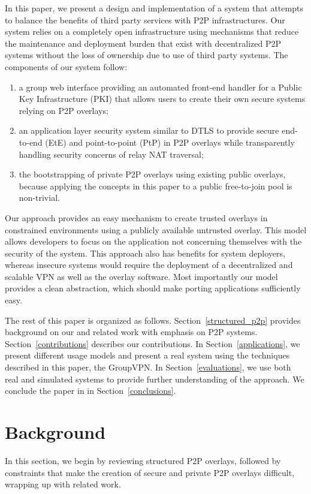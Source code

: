 \documentclass[conference]{IEEEtran}
\begin{document}
In this paper, we present a design and implementation of a system that attempts
to balance the benefits of third party services with P2P infrastructures.
Our system relies on a completely open infrastructure using mechanisms that
reduce the maintenance and deployment burden that exist with decentralized
P2P systems without the loss of ownership due to use of third party systems.
The components of our system follow:
\begin{enumerate}
\setlength{\itemsep}{0pt}
\setlength{\parskip}{0pt}
\item a group web interface providing an automated front-end handler for a 
Public Key Infrastructure (PKI) that allows users to create their own secure
systems relying on P2P overlays;
\item an application layer security system similar to DTLS to provide secure
end-to-end (EtE) and point-to-point (PtP) in P2P overlays while transparently
handling security concerns of relay NAT traversal;
\item the bootstrapping of private P2P overlays using existing public overlays,
because applying the concepts in this paper to a public free-to-join pool
is non-trivial.
\end{enumerate}

Our approach provides an easy mechanism to create trusted overlays in
constrained environments using a publicly available untrusted overlay.  This
model allows developers to focus on the application not concerning themselves
with the security of the system.  This approach also has benefits for system
deployers, whereas insecure systems would require the deployment of a
decentralized and scalable VPN as well as the overlay software.  Most
importantly our model provides a clean abstraction, which should make porting
applications sufficiently easy.

The rest of this paper is organized as follows.  Section~\ref{structured_p2p}
provides background on our and related work with emphasis on P2P systems.
Section~\ref{contributions} describes our contributions.  In
Section~\ref{applications}, we present different usage models and present a
real system using the techniques described in this paper, the GroupVPN.  In
Section~\ref{evaluations}, we use both real and simulated systems to provide
further understanding of the approach.  We conclude the paper in in
Section~\ref{conclusions}.

\section{Background}
\label{background}
In this section, we begin by reviewing structured P2P overlays, followed by
constraints that make the creation of secure and private P2P overlays
difficult, wrapping up with related work.
\end{document}
